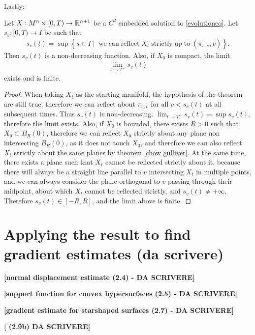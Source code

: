 Lastly: 
\begin{cor}
	Let $X:M^n\times [0,T) \rightarrow \mathbb{R}^{n+1}$ be a $C^2$ embedded solution to \ref{evolutioneq}. Let $s_v:[0,T) \rightarrow I$ be such that 
	\begin{align*}
		s_v(t)= \sup\left\{s \in I \;|\;  \; \mathrm{we \; can \; reflect \;} X_t \mathrm{ \; strictly \; up \; to }\; (\pi_{v, s}, v) \right\}.
	\end{align*}
	Then $s_v(t)$ is a non-decreasing function. Also, if $X_0$ is compact, the limit
	\begin{align*}
		\lim_{t\rightarrow T^-} s_v(t)
	\end{align*}
	exists and is finite.
\end{cor}
\begin{proof}
	When taking $X_t$ as the starting manifold, the hypothesis of the theorem are still true, therefore we can reflect about $\pi_{c, v}$  for all $c<s_v(t)$ at all subsequent times. Thus $s_v(t)$ is non-decreasing. $\lim_{t\rightarrow T^-} s_v(t) = \sup s_v(t)$, therefore the limit exists. Also, if $X_0$ is bounded, there exists $R>0$ such that $X_0\subset B_R(0)$, therefore we can reflect $X_0$ strictly about any plane non intersecting $B_R(0)$, as it does not touch $X_0$, and therefore we can also reflect $X_t$ strictly about the same planes by theorem \ref{chow gulliver}. At the same time, there exists a plane such that $X_t$ cannot be reflected strictly about it, because there will always be a straight line parallel to $v$ intersecting $X_t$ in multiple points, and we can always consider the plane orthogonal to $v$ passing through their midpoint, about which $X_t$ cannot be reflected strictly, and $s_v(t) \neq +\infty$. Therefore  $s_v(t)\in [-R, R]$, and the limit above is finite. 
\end{proof}


\section{Applying the result to find gradient estimates (da scrivere)}

{\LARGE \textbf{[normal displacement estimate (2.4) - DA SCRIVERE]}}

{\LARGE \textbf{[support function for convex hypersurfaces (2.5) - DA SCRIVERE]}}

{\LARGE \textbf{[gradient estimate for starshaped surfaces (2.7) - DA SCRIVERE]}}

{\LARGE \textbf{[ (2.9b) DA SCRIVERE]}}

